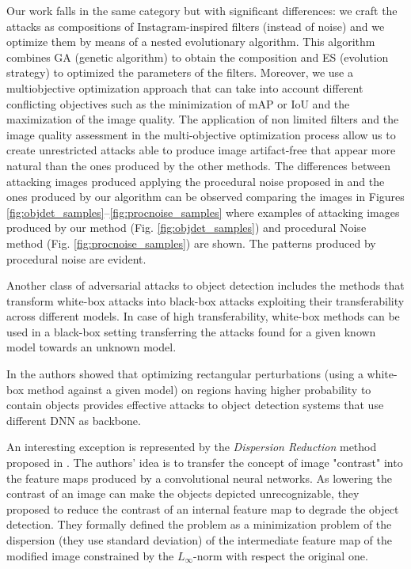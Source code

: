 Our work falls in the same category but with significant differences: we craft the attacks as compositions of Instagram-inspired filters (instead of noise) and we optimize them by means of a nested evolutionary algorithm. This algorithm combines GA (genetic algorithm) to obtain the composition and ES (evolution strategy) to optimized the parameters of the filters. Moreover, we use a multiobjective optimization approach that can take into account different conflicting objectives such as the minimization of mAP or IoU and the maximization of the image quality. The application of non limited filters and the image quality assessment in the multi-objective optimization process allow us to create unrestricted attacks able to produce image artifact-free that appear more natural than the ones produced by the other methods. The differences between attacking images produced applying the procedural noise proposed in \cite{procNoise_co2019} and the ones produced by our algorithm can be observed comparing the images in Figures \ref{fig:objdet_samples}--\ref{fig:procnoise_samples} where examples of attacking images produced by our method (Fig. \ref{fig:objdet_samples}) and procedural Noise method (Fig. \ref{fig:procnoise_samples}) are shown. The patterns produced by procedural noise are evident.

Another class of adversarial attacks to object detection includes the methods that transform white-box attacks into black-box attacks exploiting their transferability across different models. In case of high transferability, white-box  methods can be used in a black-box setting transferring the attacks found for a given known model towards an unknown model. 

In \cite{liang2021parallel} the authors showed that optimizing rectangular perturbations (using a white-box method against a given model) on regions having higher probability to contain objects provides effective attacks to object detection systems that use different DNN as backbone.  

An interesting exception is represented by the \textit{Dispersion Reduction} method proposed in \cite{Lu_2020_CVPR}. The authors' idea is to transfer the concept of image "contrast"  into the feature maps produced by a convolutional neural networks. As lowering the contrast of an image can make the objects depicted unrecognizable, they proposed to reduce the contrast of an internal feature map to degrade the object detection. They formally defined the problem as a minimization problem of the dispersion (they use standard deviation) of the intermediate feature map of the modified image constrained by the $L_\infty$-norm with respect the original one.

